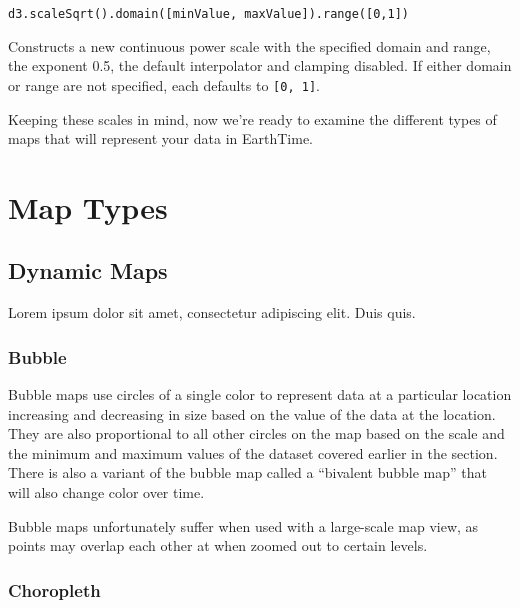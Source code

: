 \documentclass[
]{book}
\begin{document}
\texttt{d3.scaleSqrt().domain({[}minValue,\ maxValue{]}).range({[}0,1{]})}

Constructs a new continuous power scale with the specified domain and range, the exponent 0.5, the default interpolator and clamping disabled. If either domain or range are not specified, each defaults to \texttt{{[}0,\ 1{]}}.

Keeping these scales in mind, now we're ready to examine the different types of maps that will represent your data in EarthTime.

\hypertarget{map-types}{%
\section{Map Types}\label{map-types}}

\hypertarget{dynamic-maps}{%
\subsection*{Dynamic Maps}\label{dynamic-maps}}


Lorem ipsum dolor sit amet, consectetur adipiscing elit. Duis quis.

\hypertarget{bubble}{%
\subsubsection*{Bubble}\label{bubble}}


Bubble maps use circles of a single color to represent data at a particular location increasing and decreasing in size based on the value of the data at the location. They are also proportional to all other circles on the map based on the scale and the minimum and maximum values of the dataset covered earlier in the section. There is also a variant of the bubble map called a ``bivalent bubble map'' that will also change color over time.

Bubble maps unfortunately suffer when used with a large-scale map view, as points may overlap each other at when zoomed out to certain levels.

\hypertarget{choropleth}{%
\subsubsection*{Choropleth}\label{choropleth}}
\end{document}
